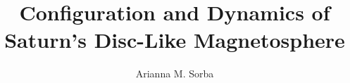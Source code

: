 \documentclass[11pt,phd,a4paper,twoside]{ucl_thesis}
\title{Configuration and Dynamics of Saturn's Disc-Like Magnetosphere}
\author{Arianna M. Sorba}
\begin{document}
\nobibliography*


%
%
%
%
%
%
%
% 








\end{document}
